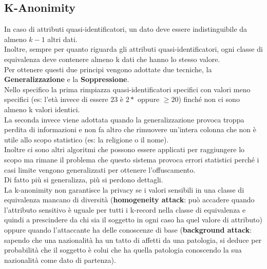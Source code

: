 \subsection{K-Anonimity}
In caso di attributi quasi-identificatori, un dato deve essere indistinguibile da almeno $k-1$ altri dati.\\
Inoltre, sempre per quanto riguarda gli attributi quasi-identificatori, ogni classe di equivalenza deve contenere almeno k dati che hanno lo stesso valore.\\
Per ottenere questi due principi vengono adottate due tecniche, la \textbf{Generalizzazione} e la \textbf{Soppressione}.\\
Nello specifico la prima rimpiazza quasi-identificatori specifici con valori meno specifici (es: l'età invece di essere $23$ è $2*$ oppure $\geq20$) finché non ci sono almeno k valori identici.\\
La seconda invece viene adottata quando la generalizzazione provoca troppa perdita di informazioni e non fa altro che rimuovere un'intera colonna che non è utile allo scopo statistico (es: la religione o il nome).\\
Inoltre ci sono altri algoritmi che possono essere applicati per raggiungere lo scopo ma rimane il problema che questo sistema provoca errori statistici perché i casi limite vengono generalizzati per ottenere l'offuscamento.\\
Di fatto più si generalizza, più si perdono dettagli.\\
La k-anonimity non garantisce la privacy se i valori sensibili in una classe di equivalenza mancano di diversità (\textbf{homogeneity attack}: può accadere quando l'attributo sensitivo è uguale per tutti i k-record nella classe di equivalenza e quindi a prescindere da chi sia il soggetto in ogni caso ha quel valore di attributo) oppure quando l'attaccante ha delle conoscenze di base (\textbf{background attack}: sapendo che una nazionalità ha un tatto di affetti da una patologia, si deduce per probabilità che il soggetto è colui che ha quella patologia conoscendo la sua nazionalità come dato di partenza).

